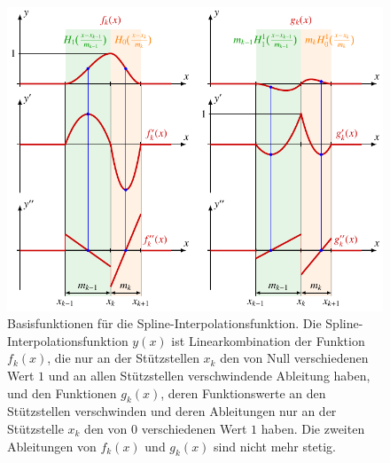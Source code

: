 %
%
%
\begin{figure}
\centering
\includegraphics{chapters/030-nichtdiff/images/interpolation.pdf}
\caption{Basisfunktionen für die Spline-Interpolationsfunktion.
Die Spline-Interpolationsfunktion $y(x)$ ist Linearkombination der
Funktion $f_k(x)$, die nur an der Stützstellen $x_k$ den von Null
verschiedenen Wert $1$ und an allen Stützstellen verschwindende
Ableitung haben, und den Funktionen $g_k(x)$, deren Funktionswerte
an den Stützstellen verschwinden und deren Ableitungen nur an der
Stützstelle $x_k$ den von 0 verschiedenen Wert $1$ haben.
Die zweiten Ableitungen von $f_k(x)$ und $g_k(x)$ sind nicht
mehr stetig.
\label{buch:nichtdiff:splines:fig:interpolation}}
\end{figure}
